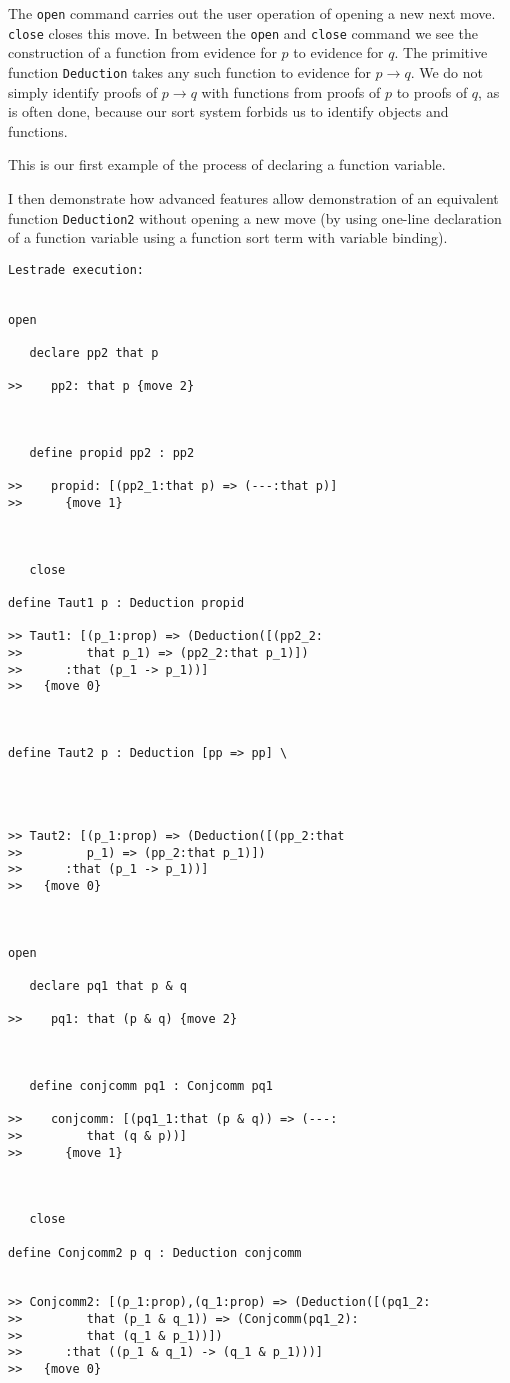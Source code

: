 \documentclass{article}
\begin{document}
The {\tt open} command carries out the user operation of opening a new next move.  {\tt close} closes this move.  In between the {\tt open}
and {\tt close} command we see the construction of a function from evidence for $p$ to evidence for $q$.  The primitive function {\tt Deduction} takes any such function to evidence for $p \rightarrow q$.  We do not simply identify proofs of $p \rightarrow q$ with functions from proofs of $p$ to proofs of $q$, as is often done,  because our sort system forbids us to identify objects and functions.

This is our first example of the process of declaring a function variable.

I then demonstrate how advanced features allow demonstration of an equivalent function {\tt Deduction2} without opening a new move (by using one-line declaration of a function variable using a function sort term with variable binding).

\begin{verbatim}Lestrade execution:


open

   declare pp2 that p

>>    pp2: that p {move 2}



   define propid pp2 : pp2

>>    propid: [(pp2_1:that p) => (---:that p)]
>>      {move 1}



   close

define Taut1 p : Deduction propid

>> Taut1: [(p_1:prop) => (Deduction([(pp2_2:
>>         that p_1) => (pp2_2:that p_1)])
>>      :that (p_1 -> p_1))]
>>   {move 0}



define Taut2 p : Deduction [pp => pp] \
   



>> Taut2: [(p_1:prop) => (Deduction([(pp_2:that
>>         p_1) => (pp_2:that p_1)])
>>      :that (p_1 -> p_1))]
>>   {move 0}



open

   declare pq1 that p & q

>>    pq1: that (p & q) {move 2}



   define conjcomm pq1 : Conjcomm pq1

>>    conjcomm: [(pq1_1:that (p & q)) => (---:
>>         that (q & p))]
>>      {move 1}



   close

define Conjcomm2 p q : Deduction conjcomm


>> Conjcomm2: [(p_1:prop),(q_1:prop) => (Deduction([(pq1_2:
>>         that (p_1 & q_1)) => (Conjcomm(pq1_2):
>>         that (q_1 & p_1))])
>>      :that ((p_1 & q_1) -> (q_1 & p_1)))]
>>   {move 0}


\end{verbatim}
\end{document}
